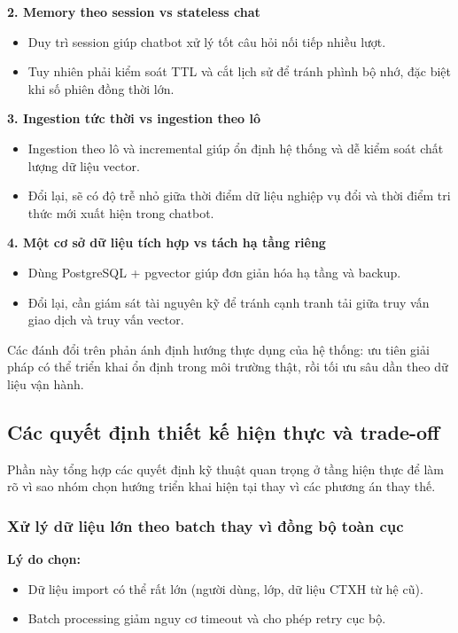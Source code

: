 \textbf{2. Memory theo session vs stateless chat}
\begin{itemize}
	\item Duy trì session giúp chatbot xử lý tốt câu hỏi nối tiếp nhiều lượt.
	\item Tuy nhiên phải kiểm soát TTL và cắt lịch sử để tránh phình bộ nhớ, đặc biệt khi số phiên đồng thời lớn.
\end{itemize}

\textbf{3. Ingestion tức thời vs ingestion theo lô}
\begin{itemize}
	\item Ingestion theo lô và incremental giúp ổn định hệ thống và dễ kiểm soát chất lượng dữ liệu vector.
	\item Đổi lại, sẽ có độ trễ nhỏ giữa thời điểm dữ liệu nghiệp vụ đổi và thời điểm tri thức mới xuất hiện trong chatbot.
\end{itemize}

\textbf{4. Một cơ sở dữ liệu tích hợp vs tách hạ tầng riêng}
\begin{itemize}
	\item Dùng PostgreSQL + pgvector giúp đơn giản hóa hạ tầng và backup.
	\item Đổi lại, cần giám sát tài nguyên kỹ để tránh cạnh tranh tải giữa truy vấn giao dịch và truy vấn vector.
\end{itemize}

Các đánh đổi trên phản ánh định hướng thực dụng của hệ thống: ưu tiên giải pháp có thể triển khai ổn định trong môi trường thật, rồi tối ưu sâu dần theo dữ liệu vận hành.

\subsection{Các quyết định thiết kế hiện thực và trade-off}
Phần này tổng hợp các quyết định kỹ thuật quan trọng ở tầng hiện thực để làm rõ vì sao nhóm chọn hướng triển khai hiện tại thay vì các phương án thay thế.

\subsubsection{Xử lý dữ liệu lớn theo batch thay vì đồng bộ toàn cục}
\textbf{Lý do chọn:}
\begin{itemize}
	\item Dữ liệu import có thể rất lớn (người dùng, lớp, dữ liệu CTXH từ hệ cũ).
	\item Batch processing giảm nguy cơ timeout và cho phép retry cục bộ.
\end{itemize}

